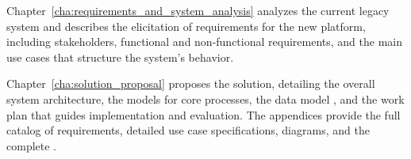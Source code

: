   {
    Chapter~\ref{cha:requirements_and_system_analysis} analyzes the current legacy system and describes the elicitation of
    requirements for the new platform, including stakeholders, functional and non-functional requirements, and the main use
    cases that structure the system's behavior.
  }

  {
    Chapter~\ref{cha:solution_proposal} proposes the solution, detailing the overall system architecture, the  models for
    core processes, the data model , and the work plan that guides implementation and evaluation.
    The appendices provide the full catalog of requirements, detailed use case specifications,  diagrams, and 
    the complete .
  }


